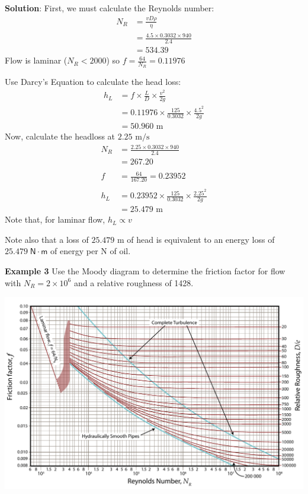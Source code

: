 \documentclass[10pt]{amsart}
\begin{document}
	\textbf{Solution}:
	First, we must calculate the Reynolds number:
	\begin{align*}
		N_R &= \frac{vD\rho}{\eta}\\
		&=\frac{4.5\times 0.3032\times 940}{2.4}\\
		&= 534.39
	\end{align*}
	Flow is laminar ($N_R<2000$) so $f=\frac{64}{N_R}=0.11976$\par
	Use Darcy's Equation to calculate the head loss:
	\begin{align*}
		h_L &= f\times \frac{L}{D}\times\frac{v^2}{2g}\\
		&=0.11976\times\frac{125}{0.3032}\times\frac{4.5^2}{2g}\\
		&= 50.960\text{ m}
	\end{align*}
	Now, calculate the headloss at $2.25\text{ m/s}$
	\begin{align*}
		N_R &= \frac{2.25\times 0.3032\times 940}{2.4}\\
		&= 267.20\\\\
		f &= \frac{64}{167.20}=0.23952\\\\
		h_L	&=0.23952\times\frac{125}{0.3032}\times\frac{2.25^2}{2g}\\
		&= 25.479\text{ m}
	\end{align*}
	Note that, for laminar flow, $h_L\propto v$
	\par\medskip Note also that a loss of $25.479\text{ m}$ of head is equivalent to an energy loss of $25.479\;\mathsf{N\cdot m}$ of
	energy per N of oil. 
	
	\par\vfill\newpage

	
	\raggedright
	\textbf{Example 3}	
	Use the Moody diagram to determine the friction factor for flow with $N_R=2\times 10^6$ and a relative roughness of
	1428.\par\bigskip
	\begin{center}
		\includegraphics[scale=1.1, angle=90]{../../figs/05FrictionLosses/moody.pdf}
	\end{center}
	
\end{document}
